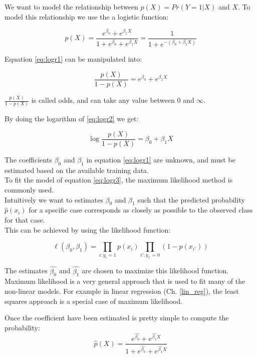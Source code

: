 We want to model the relationship between $p(X) = Pr(Y = 1|X)$ and $X$. To model this relationship we use the a logistic function:

\begin{equation} \label{eq:logr1}
		p(X) = \frac{e^{\beta_{0}} + e^{\beta_{1}X}}{1+ e^{\beta_{0}} + e^{\beta_{1}X}} = \frac{1}{1 + e^{-({\beta_{0} + \beta_{1}X})}}
\end{equation} 

Equation \ref{eq:logr1} can be manipulated into: 

\begin{equation} \label{eq:logr2}
	\frac{p(X)}{1 - p(X)} = e^{\beta_{0}} + e^{\beta_{1}X}
\end{equation} 

$\frac{p(X)}{1 - p(X)}$ is called odds, and can take any value between $0$ and $\infty$.

By doing the logarithm of \ref{eq:logr2} we get:

\begin{equation} \label{eq:logr3}
	\log{\frac{p(X)}{1 - p(X)}} = \beta_{0} + \beta_{1}X
\end{equation} 

The coefficients $\beta_{0}$ and $\beta_{1}$ in equation \ref{eq:logr1} are unknown, and must be estimated based on the available training data. \\
To fit the model of equation \ref{eq:logr3}, the maximum likelihood method is commonly used. \\
Intuitively we want to estimates $\beta_{0}$ and $\beta_{1}$ such that the predicted probability ${\hat{p}}(x_i)$ for a specific case corresponds as closely as possible to the observed class for that case.\\
This can be achieved by using the likelihood function:

\begin{equation} \label{eq:logr4}
	\ell(\beta_{0}, \beta_{1}) = \prod_{i:y_i = 1}p(x_i) \prod_{i':{y_{i'}} = 0} (1- p(x_{i'}))
\end{equation} 

The estimates $\hat{\beta_{0}}$ and $\hat{\beta_{1}}$ are chosen to maximize this likelihood function.\\
Maximum likelihood is a very general approach that is used to fit many of the non-linear models. For example in linear regression (Ch. \ref{lin_reg}), the least squares approach is a special case of maximum likelihood.

Once the coefficient have been estimated is pretty simple to compute the probability:
\begin{equation}
	\hat{p}(X) = \frac{e^{\hat{\beta_{0}}} + e^{\hat{\beta_{1}}X}}{1+ e^{\hat{\beta_{0}}} + e^{\hat{\beta_{1}}X}}
\end{equation}

